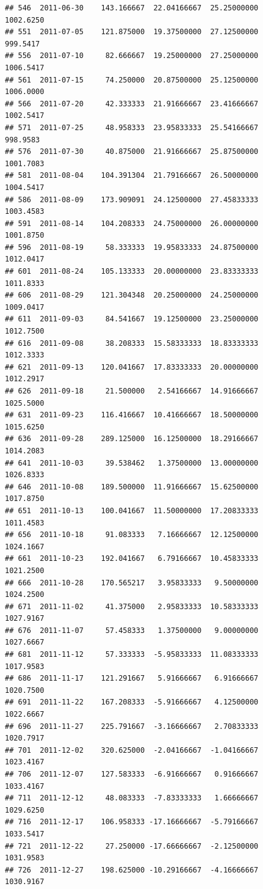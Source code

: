 \documentclass[
]{article}
\begin{document}
\begin{verbatim}
## 546  2011-06-30    143.166667  22.04166667  25.25000000    1002.6250
## 551  2011-07-05    121.875000  19.37500000  27.12500000     999.5417
## 556  2011-07-10     82.666667  19.25000000  27.25000000    1006.5417
## 561  2011-07-15     74.250000  20.87500000  25.12500000    1006.0000
## 566  2011-07-20     42.333333  21.91666667  23.41666667    1002.5417
## 571  2011-07-25     48.958333  23.95833333  25.54166667     998.9583
## 576  2011-07-30     40.875000  21.91666667  25.87500000    1001.7083
## 581  2011-08-04    104.391304  21.79166667  26.50000000    1004.5417
## 586  2011-08-09    173.909091  24.12500000  27.45833333    1003.4583
## 591  2011-08-14    104.208333  24.75000000  26.00000000    1001.8750
## 596  2011-08-19     58.333333  19.95833333  24.87500000    1012.0417
## 601  2011-08-24    105.133333  20.00000000  23.83333333    1011.8333
## 606  2011-08-29    121.304348  20.25000000  24.25000000    1009.0417
## 611  2011-09-03     84.541667  19.12500000  23.25000000    1012.7500
## 616  2011-09-08     38.208333  15.58333333  18.83333333    1012.3333
## 621  2011-09-13    120.041667  17.83333333  20.00000000    1012.2917
## 626  2011-09-18     21.500000   2.54166667  14.91666667    1025.5000
## 631  2011-09-23    116.416667  10.41666667  18.50000000    1015.6250
## 636  2011-09-28    289.125000  16.12500000  18.29166667    1014.2083
## 641  2011-10-03     39.538462   1.37500000  13.00000000    1026.8333
## 646  2011-10-08    189.500000  11.91666667  15.62500000    1017.8750
## 651  2011-10-13    100.041667  11.50000000  17.20833333    1011.4583
## 656  2011-10-18     91.083333   7.16666667  12.12500000    1024.1667
## 661  2011-10-23    192.041667   6.79166667  10.45833333    1021.2500
## 666  2011-10-28    170.565217   3.95833333   9.50000000    1024.2500
## 671  2011-11-02     41.375000   2.95833333  10.58333333    1027.9167
## 676  2011-11-07     57.458333   1.37500000   9.00000000    1027.6667
## 681  2011-11-12     57.333333  -5.95833333  11.08333333    1017.9583
## 686  2011-11-17    121.291667   5.91666667   6.91666667    1020.7500
## 691  2011-11-22    167.208333  -5.91666667   4.12500000    1022.6667
## 696  2011-11-27    225.791667  -3.16666667   2.70833333    1020.7917
## 701  2011-12-02    320.625000  -2.04166667  -1.04166667    1023.4167
## 706  2011-12-07    127.583333  -6.91666667   0.91666667    1033.4167
## 711  2011-12-12     48.083333  -7.83333333   1.66666667    1029.6250
## 716  2011-12-17    106.958333 -17.16666667  -5.79166667    1033.5417
## 721  2011-12-22     27.250000 -17.66666667  -2.12500000    1031.9583
## 726  2011-12-27    198.625000 -10.29166667  -4.16666667    1030.9167

\end{verbatim}
\end{document}
